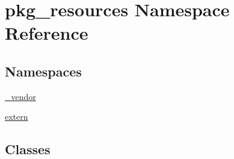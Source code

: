 \hypertarget{namespacepkg__resources}{}\section{pkg\+\_\+resources Namespace Reference}
\label{namespacepkg__resources}
\subsection*{Namespaces}
\begin{DoxyCompactItemize}
\item 
 \hyperlink{namespacepkg__resources_1_1__vendor}{\+\_\+vendor}
\item 
 \hyperlink{namespacepkg__resources_1_1extern}{extern}
\end{DoxyCompactItemize}
\subsection*{Classes}
